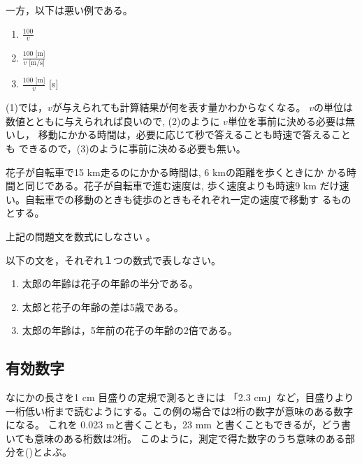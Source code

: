 \documentclass[twocolumn,11pt]{jarticle}
\begin{document}
一方，以下は悪い例である。
\begin{enumerate}
\item $\displaystyle\frac{100}{v}$
\item $\displaystyle\frac{100\mbox{~[m]}}{v\mbox{~[m$/$s]}}$
\item $\displaystyle\frac{100\mbox{~[m]}}{v}$ [s]
\end{enumerate}
(1)では，$v$が与えられても計算結果が何を表す量かわからなくなる。
$v$の単位は数値とともに与えられれば良いので, (2)のように
$v$単位を事前に決める必要は無いし，
移動にかかる時間は，必要に応じて秒で答えることも時速で答えることも
できるので，(3)のように事前に決める必要も無い。

\noindent
[問]  花子が自転車で15 km走るのにかかる時間は, 6 kmの距離を歩くときにか
かる時間と同じである。花子が自転車で進む速度は, 歩く速度よりも時速9 km
だけ速い。自転車での移動のときも徒歩のときもそれぞれ一定の速度で移動す
るものとする。

上記の問題文を数式にしなさい
。

\exercise
以下の文を，それぞれ１つの数式で表しなさい。
\begin{enumerate}
	\item 太郎の年齢は花子の年齢の半分である。
	\item 太郎と花子の年齢の差は5歳である。
	\item 太郎の年齢は，5年前の花子の年齢の2倍である。
\end{enumerate}

\subsection{有効数字}
なにかの長さを1 cm 目盛りの定規で測るときには 「2.3 cm」など，目盛りより一桁低い桁まで読むようにする。この例の場合では2桁の数字が意味のある数字になる。
これを 0.023 mと書くことも，23 mm と書くこともできるが，どう書いても意味のある桁数は2桁。
このように，測定で得た数字のうち意味のある部分を()とよぶ。
\end{document}
